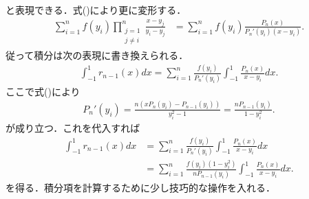 \documentclass[a4j,papersize,disablejfam,slide,14pt]{jsarticle}
\begin{document}
    と表現できる．式()により更に変形する．
    \begin{align}
    	\sum_{i=1}^{n} f(y_i) \prod_{\substack{j=1 \\ j \neq i}}^{n} \frac{x-y_j}{y_i - y_j}
        &= \sum_{i=1}^{n} f(y_i) \frac{P_n(x)}{P_n'(y_i) (x - y_i)}.
    \end{align}
    従って積分は次の表現に書き換えられる．
    \begin{align}
    	\int_{-1}^{1} r_{n-1}(x) dx = \sum_{i=1}^{n} \frac{f(y_i)}{P_n'(y_i)} \int_{-1}^{1} \frac{P_n(x)}{x-y_i} dx.
    \end{align}
    ここで式()により
    \begin{align}
    	P_n'(y_i) = \frac{n\left( xP_n(y_i) - P_{n-1}(y_i) \right)}{y_i^2 - 1} = \frac{nP_{n-1}(y_i)}{1-y_i^2}.
    \end{align}
    が成り立つ．これを代入すれば
    \begin{align}
    	\int_{-1}^{1} r_{n-1}(x) dx &= \sum_{i=1}^{n} \frac{f(y_i)}{P_n'(y_i)} \int_{-1}^{1} \frac{P_n(x)}{x-y_i} dx \\
        &= \sum_{i=1}^{n} \frac{f(y_i) (1-y_i^2)}{nP_{n-1}(y_i)} \int_{-1}^{1} \frac{P_n(x)}{x-y_i} dx.
    \end{align}
    を得る．積分項を計算するために少し技巧的な操作を入れる．
    
\end{document}
